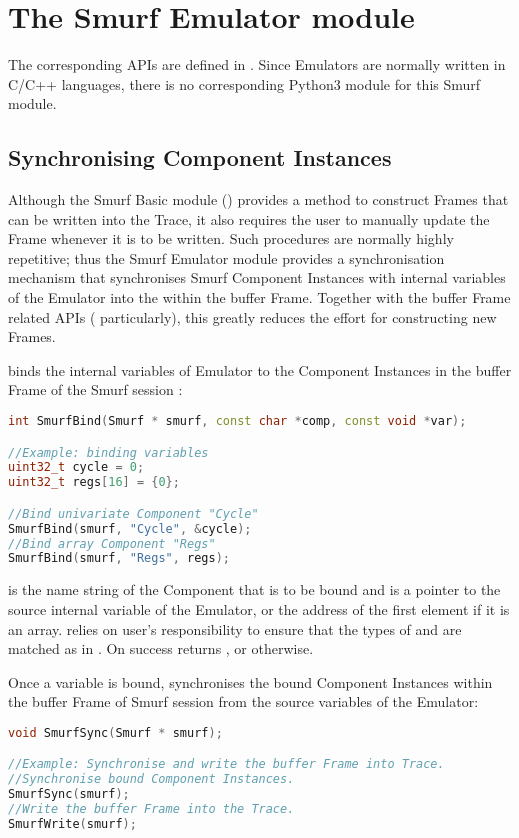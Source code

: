 \section{The Smurf Emulator module\label{sec:SmurfEmulator}}
The corresponding APIs are defined in . Since Emulators are normally written in C/C++ languages, there is no corresponding Python3 module for this Smurf module.

\subsection{Synchronising Component Instances}
Although the Smurf Basic module () provides a method to construct Frames that can be written into the Trace, it also requires the user to manually update the Frame whenever it is to be written. Such procedures are normally highly repetitive; thus the Smurf Emulator module provides a synchronisation mechanism that synchronises Smurf Component Instances with internal variables of the Emulator into the  within the buffer Frame. Together with the buffer Frame related APIs ( particularly), this greatly reduces the effort for constructing new Frames.

 binds the internal variables of Emulator to the Component Instances in the buffer Frame of the Smurf session :
\begin{lstlisting}[language=C++, caption={SmurfBind()\label{api:SmurfBindC}}]
int SmurfBind(Smurf * smurf, const char *comp, const void *var);

//Example: binding variables
uint32_t cycle = 0;
uint32_t regs[16] = {0};

//Bind univariate Component "Cycle"
SmurfBind(smurf, "Cycle", &cycle);
//Bind array Component "Regs"
SmurfBind(smurf, "Regs", regs);
\end{lstlisting}

 is the name string of the Component that is to be bound and  is a pointer to the source internal variable of the Emulator, or the address of the first element if it is an array.  relies on user's responsibility to ensure that the types of  and  are matched as in . On success  returns , or  otherwise.

Once a variable is bound,  synchronises the bound Component Instances within the buffer Frame of Smurf session  from the source variables of the Emulator:
\begin{lstlisting}[language=C++, caption={SmurfSync()\label{api:SmurfSyncC}}]
void SmurfSync(Smurf * smurf);

//Example: Synchronise and write the buffer Frame into Trace.
//Synchronise bound Component Instances.
SmurfSync(smurf);
//Write the buffer Frame into the Trace.
SmurfWrite(smurf);
\end{lstlisting}


